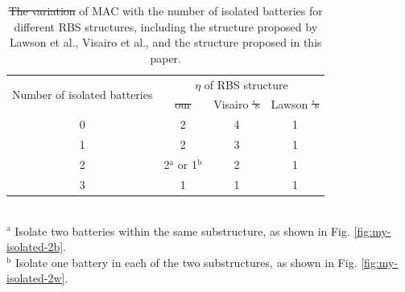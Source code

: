 \documentclass{article}
\providecommand{\DIFadd}[1]{{\protect\color{blue}\uwave{#1}}} %
\providecommand{\DIFdel}[1]{{\protect\color{red}\sout{#1}}}                      %
\providecommand{\DIFaddFL}[1]{\DIFadd{#1}} %
\providecommand{\DIFdelFL}[1]{\DIFdel{#1}} %
\providecommand{\DIFaddbeginFL}{} %
\providecommand{\DIFaddendFL}{} %
\providecommand{\DIFdelbeginFL}{} %
\providecommand{\DIFdelendFL}{} %
\newcommand{\DIFscaledelfig}{0.5}
\newlength{\DIFdelgraphicswidth} %
\newlength{\DIFdelgraphicsheight} %
\newcommand{\DIFaddincludegraphics}[2][]{{\color{blue}\fbox{\DIFOincludegraphics[#1]{#2}}}} %
\newcommand{\DIFdelincludegraphics}[2][]{%
\sbox{\DIFdelgraphicsbox}{\DIFOincludegraphics[#1]{#2}}%
\settoboxwidth{\DIFdelgraphicswidth}{\DIFdelgraphicsbox} %
\settoboxtotalheight{\DIFdelgraphicsheight}{\DIFdelgraphicsbox} %
\scalebox{\DIFscaledelfig}{%
\parbox[b]{\DIFdelgraphicswidth}{\usebox{\DIFdelgraphicsbox}\\[-\baselineskip] \rule{\DIFdelgraphicswidth}{0em}}\llap{\resizebox{\DIFdelgraphicswidth}{\DIFdelgraphicsheight}{%
\setlength{\unitlength}{\DIFdelgraphicswidth}%
\begin{picture}(1,1)%
\thicklines\linethickness{2pt} %
{\color[rgb]{1,0,0}\put(0,0){\framebox(1,1){}}}%
{\color[rgb]{1,0,0}\put(0,0){\line( 1,1){1}}}%
{\color[rgb]{1,0,0}\put(0,1){\line(1,-1){1}}}%
\end{picture}%
}\hspace*{3pt}}} %
} %
\DeclareRobustCommand{\DIFaddbeginFL}{\DIFOaddbeginFL \let\includegraphics\DIFaddincludegraphics} %
\DeclareRobustCommand{\DIFaddendFL}{\DIFOaddendFL \let\includegraphics\DIFOincludegraphics} %
\DeclareRobustCommand{\DIFdelbeginFL}{\DIFOdelbeginFL \let\includegraphics\DIFdelincludegraphics} %
\DeclareRobustCommand{\DIFdelendFL}{\DIFOaddendFL \let\includegraphics\DIFOincludegraphics} %
\begin{document}
\begin{table}[htbp]
    \centering
    \caption{
      \DIFdelbeginFL \DIFdelFL{The variation }\DIFdelendFL \DIFaddbeginFL \DIFaddFL{Variation }\DIFaddendFL of MAC with the number of isolated batteries for different RBS structures, including the structure proposed by Lawson et al., Visairo et al., and the structure proposed in this paper.
      }
      \label{tab:isolated_mac}
      \begin{tabular}{cccc}
      \toprule
      \DIFdelbeginFL %
\DIFdelendFL \DIFaddbeginFL \multirow{2}[4]{*}{Number of isolated batteries} \DIFaddendFL & \multicolumn{3}{c}{$\eta$ of RBS structure} \\
  \cmidrule{2-4}          & \DIFdelbeginFL \DIFdelFL{our  }\DIFdelendFL \DIFaddbeginFL \DIFaddFL{This paper  }\DIFaddendFL & Visairo  \DIFdelbeginFL \DIFdelFL{'s  }\DIFdelendFL & Lawson  \DIFdelbeginFL \DIFdelFL{'s  }\DIFdelendFL \\
      \midrule
      0     & 2     & 4     & 1 \\
      1     & 2     & 3     & 1 \\
      2     & 2$^{\mathrm{a}}$ or 1$^{\mathrm{b}}$ & 2     & 1 \\
      3     & 1     & 1     & 1 \\
      \bottomrule
      \end{tabular}
      \\
      \DIFdelbeginFL %
\DIFdelendFL \DIFaddbeginFL \footnotesize{$^{\mathrm{a}}$ Isolate two batteries within the same substructure, as shown in Fig. \ref{fig:my-isolated-2b}.}\DIFaddendFL \\
      \DIFdelbeginFL %
\DIFdelendFL \DIFaddbeginFL \footnotesize{$^{\mathrm{b}}$ Isolate one battery in each of the two substructures, as shown in Fig. \ref{fig:my-isolated-2w}.}
  \DIFaddendFL \end{table}
\end{document}
